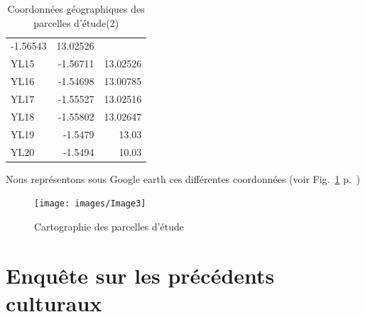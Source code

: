 \documentclass[a4paper,11pt]{article}
\begin{document}
\begin{table}
\begin{center}
\begin{tabular}{|l|r|r|}
       -1.56543 & 13.02526 \\ YL15 & -1.56711 & 13.02526 \\ YL16 &
       -1.54698 & 13.00785 \\ YL17 & -1.55527 & 13.02516 \\ YL18 &
       -1.55802 & 13.02647 \\ YL19 & -1.5479 & 13.03 \\ YL20 & -1.5494
       & 10.03 \\ \hline
     \end{tabular}
      \caption{Coordonnées géographiques des parcelles d'étude(2)}
      \label{tableau:Suite des coordonnées géographiques des parcelles}
    \end{center}
\end{table}
       
Nous représentons sous Google earth ces différentes coordonnées (voir
Fig.~\ref{fig-Image3} p.~\pageref{fig-Image3})


\begin{figure}
  \begin{center}
    \texttt{[image: images/Image3]}
  \end{center}
  \caption{Cartographie des parcelles d'étude}
  \label{fig-Image3}
\end{figure}

\newpage
\section{Enquête sur les précédents culturaux}
\end{document}

